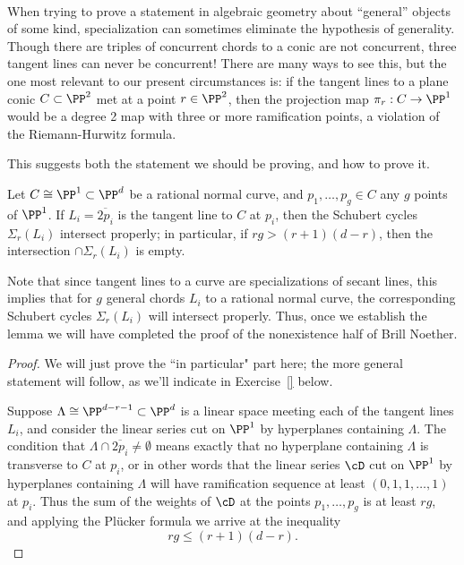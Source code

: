 \


When trying to prove a statement in algebraic geometry about ``general'' objects of some kind, specialization can sometimes eliminate the hypothesis of generality.
Though there are triples of concurrent chords to a conic are not concurrent, three tangent lines can never be concurrent! There are many ways to see this, but the one most relevant to our present circumstances is: if the tangent lines to a plane conic $C \subset \PP^2$ met at a point $r \in \PP^2$, then the projection map $\pi_r : C \to \PP^1$ would be a degree 2 map with three or more ramification points, a violation of the Riemann-Hurwitz formula.

This suggests both the statement we should be proving, and how to prove it. 

\begin{lemma}
Let $C \cong \PP^1 \subset \PP^d$ be a rational normal curve, and $p_1,\dots,p_g \in C$ any $g$ points of $\PP^1$. If $L_i = \overline{2p_i}$ is the tangent line to $C$ at $p_i$, then the Schubert cycles $\Sigma_r(L_i)$ intersect properly; in particular, if $rg > (r+1)(d-r)$, then the intersection $\cap \Sigma_r(L_i)$ is empty.
\end{lemma}

Note that since tangent lines to a curve are specializations of secant lines, this implies that for $g$ general chords $L_i$ to a rational normal curve, the corresponding Schubert cycles $\Sigma_r(L_i)$ will intersect properly.  Thus, once we establish the lemma we will have completed the proof of the nonexistence half of Brill Noether.

\begin{proof}
We will just prove the ``in particular" part here; the more general statement will follow, as we'll indicate in Exercise~\ref{} below.

Suppose $\Lambda \cong \PP^{d-r-1} \subset \PP^d$ is a linear space meeting each of the tangent lines $L_i$, and consider the linear series cut on $\PP^1$ by hyperplanes containing $\Lambda$. The condition that $\Lambda \cap \overline{2p_i} \neq \emptyset$ means exactly that no hyperplane containing $\Lambda$ is transverse to $C$ at $p_i$, or in other words that the linear series $\cD$ cut on $\PP^1$ by hyperplanes containing $\Lambda$ will have ramification sequence at least $(0, 1, 1,\dots,1)$ at $p_i$. Thus the sum of the weights of $\cD$ at the points $p_1,\dots,p_g$ is at least $rg$, and applying the Pl\"ucker formula we arrive at the inequality
$$
rg \leq (r+1)(d-r).
$$
\end{proof}


